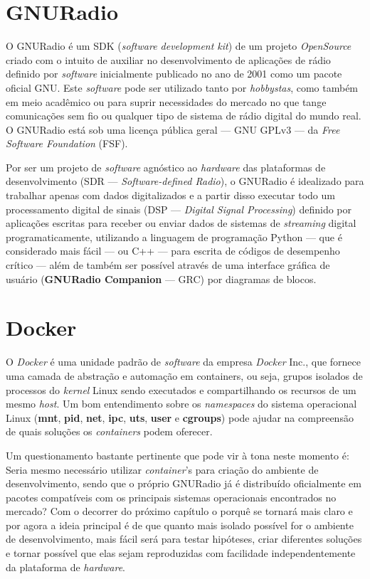\documentclass[
  12pt,				%
  openright,			%
  twoside,			%
  a4paper,			%
  english,			%
  french,				%
  spanish,			%
  brazil,				%
  ]{abntex2}
\begin{document}
\section*{GNURadio}

O GNURadio é um SDK (\textit{software development kit}) de um projeto \textit{OpenSource} criado com o intuito de auxiliar no desenvolvimento de aplicações de
rádio definido por \textit{software} inicialmente publicado no ano de 2001 como um pacote oficial GNU. Este \textit{software} pode ser utilizado tanto por \textit{hobbystas}, como
também em meio acadêmico ou para suprir necessidades do mercado no que tange comunicações sem fio ou qualquer tipo de sistema de rádio digital do mundo real.
O GNURadio está sob uma licença pública geral — GNU GPLv3 — da \textit{Free Software Foundation} (FSF).

Por ser um projeto de \textit{software} agnóstico ao \textit{hardware} das plataformas de desenvolvimento (SDR — \textit{Software-defined Radio}), o GNURadio é idealizado
para trabalhar apenas com dados digitalizados e a partir disso executar todo um processamento digital de sinais (DSP — \textit{Digital Signal Processing})
definido por aplicações escritas para receber ou enviar dados de sistemas de \textit{streaming} digital programaticamente, utilizando a linguagem de programação
Python — que é considerado mais fácil — ou C++ — para escrita de códigos de desempenho crítico — além de também ser possível através de uma interface gráfica de
usuário (\textbf{GNURadio Companion} — GRC) por diagramas de blocos.

\newpage
\section*{Docker}

O \textit{Docker} é uma unidade padrão de \textit{software} da empresa \textit{Docker} Inc., que fornece uma camada de abstração e automação em containers, ou seja, grupos isolados de
processos do \textit{kernel} Linux sendo executados e compartilhando os recursos de um mesmo \textit{host}. Um bom entendimento sobre os \textit{namespaces} do  sistema operacional
Linux (\textbf{mnt}, \textbf{pid}, \textbf{net}, \textbf{ipc}, \textbf{uts}, \textbf{user} e \textbf{cgroups}) pode ajudar na compreensão de quais soluções os
\textit{containers} podem oferecer.

Um questionamento bastante pertinente que pode vir à tona neste momento é: Seria mesmo necessário utilizar \textit{container}'s para criação
do ambiente de desenvolvimento, sendo que o próprio GNURadio já é distribuído oficialmente em pacotes compatíveis com os principais sistemas
operacionais encontrados no mercado? Com o decorrer do próximo capítulo o porquê se tornará mais claro e por agora a ideia principal é de
que quanto mais isolado possível for o ambiente de desenvolvimento, mais fácil será para testar hipóteses, criar diferentes soluções e tornar
possível que elas sejam reproduzidas com facilidade independentemente da plataforma de \textit{hardware}.
\end{document}
